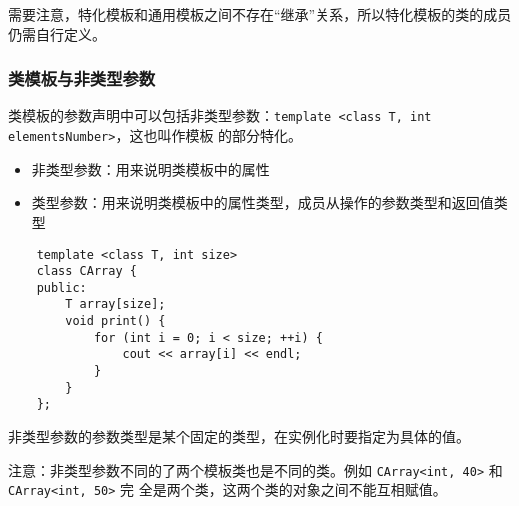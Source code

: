 \documentclass[UTF8]{ctexart}
\begin{document}
需要注意，特化模板和通用模板之间不存在“继承”关系，所以特化模板的类的成员仍需自行定义。

\subsubsection{类模板与非类型参数}
类模板的参数声明中可以包括非类型参数：\texttt{template <class T, int elementsNumber>}，这也叫作模板
的部分特化。
\begin{itemize}
    \item 非类型参数：用来说明类模板中的属性
    \item 类型参数：用来说明类模板中的属性类型，成员从操作的参数类型和返回值类型
\end{itemize}

\begin{verbatim}
    template <class T, int size>
    class CArray {
    public:
        T array[size];
        void print() {
            for (int i = 0; i < size; ++i) {
                cout << array[i] << endl;
            }
        }
    };
\end{verbatim}

非类型参数的参数类型是某个固定的类型，在实例化时要指定为具体的值。

注意：非类型参数不同的了两个模板类也是不同的类。例如 \texttt{CArray<int, 40>} 和 \texttt{CArray<int, 50>} 完
全是两个类，这两个类的对象之间不能互相赋值。
\end{document}
